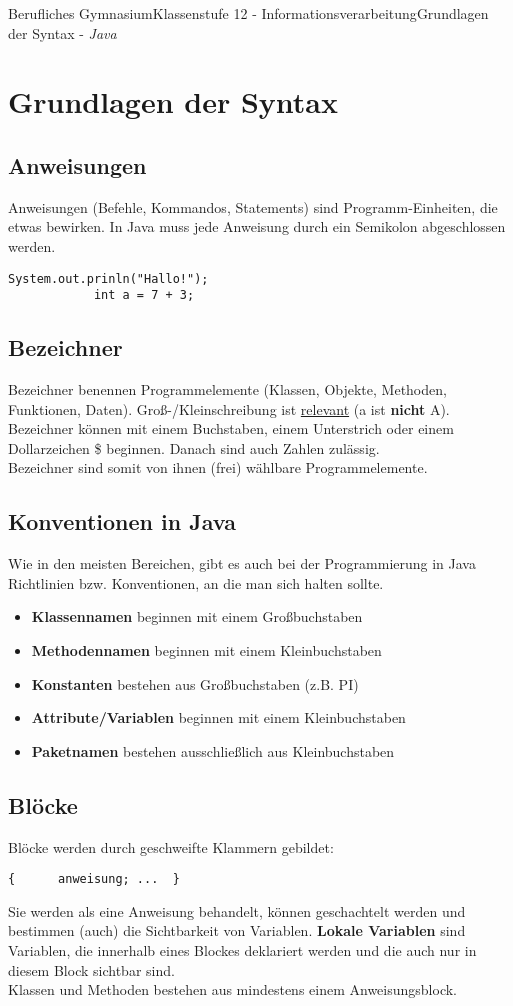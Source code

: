 \documentclass[11pt,oneside,openany,headings=optiontotoc,11pt,numbers=noenddot]{article}
\begin{document}
	\begin{worksheet}{Berufliches Gymnasium}{Klassenstufe 12 - Informationsverarbeitung}{Grundlagen der Syntax - \textit{Java}}
		\setlength{\columnseprule}{0pt}
		\setcounter{section}{1}
		\section{Grundlagen der Syntax}
		\subsection{Anweisungen}
		Anweisungen (Befehle, Kommandos, Statements) sind Programm-Einheiten, die \grqq{}etwas bewirken\grqq{}. In Java muss jede Anweisung durch ein Semikolon abgeschlossen werden.
		\begin{lstlisting}[style=JavaInputStyle]
			System.out.prinln("Hallo!");
			int a = 7 + 3;
		\end{lstlisting}
		\subsection{Bezeichner}
		Bezeichner benennen Programmelemente (Klassen, Objekte, Methoden, Funktionen, Daten). Groß-/Kleinschreibung ist \underline{relevant} (a ist \textbf{nicht} A). Bezeichner können mit einem Buchstaben, einem Unterstrich oder einem Dollarzeichen \$ beginnen. Danach sind auch Zahlen zulässig.\\
		Bezeichner sind somit von ihnen (frei) wählbare Programmelemente.
		\subsection{Konventionen in Java}
		Wie in den meisten Bereichen, gibt es auch bei der Programmierung in Java Richtlinien bzw. Konventionen, an die man sich halten sollte.
		\begin{itemize}
			\item \textbf{Klassennamen} beginnen mit einem Großbuchstaben
			\item \textbf{Methodennamen} beginnen mit einem Kleinbuchstaben
			\item \textbf{Konstanten} bestehen aus Großbuchstaben (z.B. PI)
			\item \textbf{Attribute/Variablen} beginnen mit einem Kleinbuchstaben
			\item \textbf{Paketnamen} bestehen ausschließlich aus Kleinbuchstaben
		\end{itemize}
		\subsection{Blöcke}
		Blöcke werden durch geschweifte Klammern {} gebildet:
		\begin{lstlisting}[style=JavaInputStyle]
		{	   anweisung; ...  }
		\end{lstlisting}
		Sie werden als eine Anweisung behandelt, können geschachtelt werden und bestimmen (auch) die Sichtbarkeit von Variablen. \textbf{Lokale Variablen} sind Variablen, die innerhalb eines Blockes deklariert werden und die auch nur in diesem Block sichtbar sind.\\
		Klassen und Methoden bestehen aus mindestens einem Anweisungsblock.

\end{worksheet}
\end{document}
